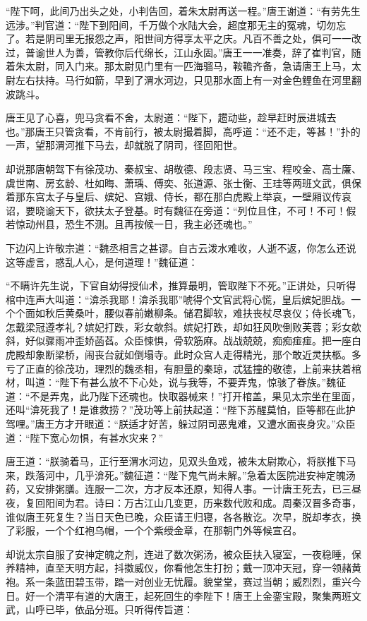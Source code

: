 \documentclass[12pt]{lsbook}
\begin{document}
“陛下呵，此间乃出头之处，小判告回，着朱太尉再送一程。”唐王谢道：“有劳先生远涉。”判官道：“陛下到阳间，千万做个水陆大会，超度那无主的冤魂，切勿忘了。若是阴司里无报怨之声，阳世间方得享太平之庆。凡百不善之处，俱可一一改过，普谕世人为善，管教你后代绵长，江山永固。”唐王一一准奏，辞了崔判官，随着朱太尉，同入门来。那太尉见门里有一匹海骝马，鞍韂齐备，急请唐王上马，太尉左右扶持。马行如箭，早到了渭水河边，只见那水面上有一对金色鲤鱼在河里翻波跳斗。

唐王见了心喜，兜马贪看不舍，太尉道：“陛下，趱动些，趁早赶时辰进城去也。”那唐王只管贪看，不肯前行，被太尉撮着脚，高呼道：“还不走，等甚！”扑的一声，望那渭河推下马去，却就脱了阴司，径回阳世。

却说那唐朝驾下有徐茂功、秦叔宝、胡敬德、段志贤、马三宝、程咬金、高士廉、虞世南、房玄龄、杜如晦、萧瑀、傅奕、张道源、张士衡、王珪等两班文武，俱保着那东宫太子与皇后、嫔妃、宫娥、侍长，都在那白虎殿上举哀，一壁厢议传哀诏，要晓谕天下，欲扶太子登基。时有魏征在旁道：“列位且住，不可！不可！假若惊动州县，恐生不测。且再按候一日，我主必还魂也。”

下边闪上许敬宗道：“魏丞相言之甚谬。自古云泼水难收，人逝不返，你怎么还说这等虚言，惑乱人心，是何道理！”魏征道：

“不瞒许先生说，下官自幼得授仙术，推算最明，管取陛下不死。”正讲处，只听得棺中连声大叫道：“渰杀我耶！渰杀我耶”唬得个文官武将心慌，皇后嫔妃胆战。一个个面如秋后黄桑叶，腰似春前嫩柳条。储君脚软，难扶丧杖尽哀仪；侍长魂飞，怎戴梁冠遵孝礼？嫔妃打跌，彩女欹斜。嫔妃打跌，却如狂风吹倒败芙蓉；彩女欹斜，好似骤雨冲歪娇菡萏。众臣悚惧，骨软筋麻。战战兢兢，痴痴痖痖。把一座白虎殿却象断梁桥，闹丧台就如倒塌寺。此时众宫人走得精光，那个敢近灵扶柩。多亏了正直的徐茂功，理烈的魏丞相，有胆量的秦琼，忒猛撞的敬德，上前来扶着棺材，叫道：“陛下有甚么放不下心处，说与我等，不要弄鬼，惊骇了眷族。”魏征道：“不是弄鬼，此乃陛下还魂也。快取器械来！”打开棺盖，果见太宗坐在里面，还叫“渰死我了！是谁救捞？”茂功等上前扶起道：“陛下苏醒莫怕，臣等都在此护驾哩。”唐王方才开眼道：“朕适才好苦，躲过阴司恶鬼难，又遭水面丧身灾。”众臣道：“陛下宽心勿惧，有甚水灾来？”

唐王道：“朕骑着马，正行至渭水河边，见双头鱼戏，被朱太尉欺心，将朕推下马来，跌落河中，几乎渰死。”魏征道：“陛下鬼气尚未解。”急着太医院进安神定魄汤药，又安排粥膳。连服一二次，方才反本还原，知得人事。一计唐王死去，已三昼夜，复回阳间为君。诗曰：万古江山几变更，历来数代败和成。周秦汉晋多奇事，谁似唐王死复生？当日天色已晚，众臣请王归寝，各各散讫。次早，脱却孝衣，换了彩服，一个个红袍乌帽，一个个紫绶金章，在那朝门外等候宣召。

却说太宗自服了安神定魄之剂，连进了数次粥汤，被众臣扶入寝室，一夜稳睡，保养精神，直至天明方起，抖擞威仪，你看他怎生打扮；戴一顶冲天冠，穿一领赭黄袍。系一条蓝田碧玉带，踏一对创业无忧履。貌堂堂，赛过当朝；威烈烈，重兴今日。好一个清平有道的大唐王，起死回生的李陛下！唐王上金銮宝殿，聚集两班文武，山呼已毕，依品分班。只听得传旨道：
\end{document}
